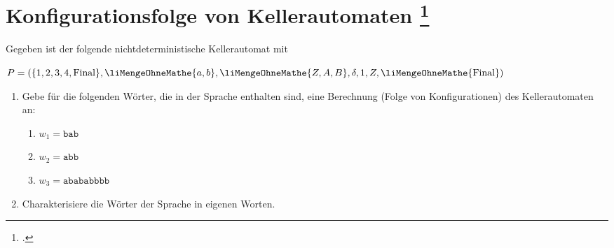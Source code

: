 \documentclass{lehramt-informatik-aufgabe}
\begin{document}
\let\m=\liMengeOhneMathe
\let\u=\liKellerUebergang

\section{Konfigurationsfolge von Kellerautomaten
\footcite{theo:ab:2}}

Gegeben ist der folgende nichtdeterministische Kellerautomat mit

$P = (\{1, 2, 3, 4, \text{Final}\}, \m{a, b}, \m{Z, A, B}, \delta, 1, Z, \m{\text{Final}})$

\begin{center}
\end{center}

\begin{enumerate}

\item Gebe für die folgenden Wörter, die in der Sprache enthalten sind,
eine Berechnung (Folge von Konfigurationen) des Kellerautomaten an:

\begin{enumerate}


\item $w_1 = \texttt{bab}$


\item $w_2 = \texttt{abb}$


\item $w_3 = \texttt{abababbbb}$
\end{enumerate}

\item Charakterisiere die Wörter der Sprache in eigenen Worten.

\end{enumerate}
\end{document}
